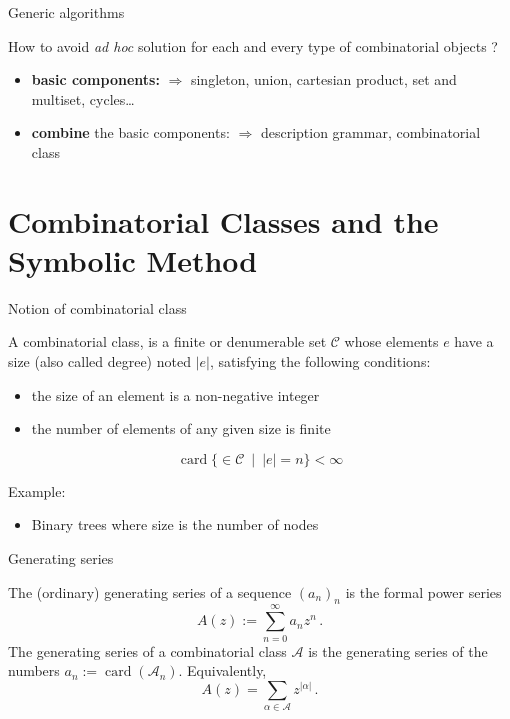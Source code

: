 \documentclass[compress,11pt]{beamer}
\def\opstyle#1{\ensuremath{\operatorname{#1}}}
\newcommand{\card}{\opstyle{card}}
\newcommand{\mA}{\mathcal{A}}
\newcommand{\mC}{\mathcal{C}}
\renewcommand{\emph}[1]{{\color{red} #1}}
\begin{document}
\begin{frame}{Generic algorithms}
  \begin{QUESTION}
    \Large
    How to avoid \textit{ad hoc} solution for each and every type of
    combinatorial objects ?
  \end{QUESTION}
  \pause\bigskip
   \begin{itemize}
   \item \textbf{basic components:}
     $\Longrightarrow$ singleton, union, cartesian product, set and
     multiset, cycles\dots\pause\bigskip
   \item \textbf{combine} the basic components:
     $\Longrightarrow$ description grammar, combinatorial class
   \end{itemize}
  \pause\bigskip

\end{frame}


\section{Combinatorial Classes and the Symbolic Method}

\begin{frame}{Notion of combinatorial class}
  \begin{DEFN}
    A \emph{combinatorial class}, is a finite or denumerable set $\mC$ whose
    elements $e$ have a size (also called degree) noted $|e|$, satisfying the
    following conditions:
    \begin{itemize}
    \item the size of an element is a non-negative integer
    \item the number of elements of any given size is finite
    \end{itemize}
    \[
    \card\{\in \mC\ \mid\ |e| = n\} < \infty
    \]
  \end{DEFN}
  \bigskip

  Example:
  \begin{itemize}
  \item Binary trees where size is the number of nodes
  \end{itemize}
\end{frame}

\begin{frame}{Generating series}
  
  \begin{DEFN}
    The (ordinary) \emph{generating series} of a sequence $(a_n)_n$ 
    is the formal power series
    \begin{equation*}
      A(z) := \sum_{n=0}^{\infty} a_n z^n\,.
    \end{equation*}
    The \emph{generating series} of a combinatorial class $\mA$ is the
    generating series of the numbers $a_n := \card(\mA_n)$. Equivalently,
    \begin{equation*}
      A(z) = \sum_{\alpha\in\mA} z^{|\alpha|}\,.
    \end{equation*}
  \end{DEFN}
\end{frame}
\end{document}
